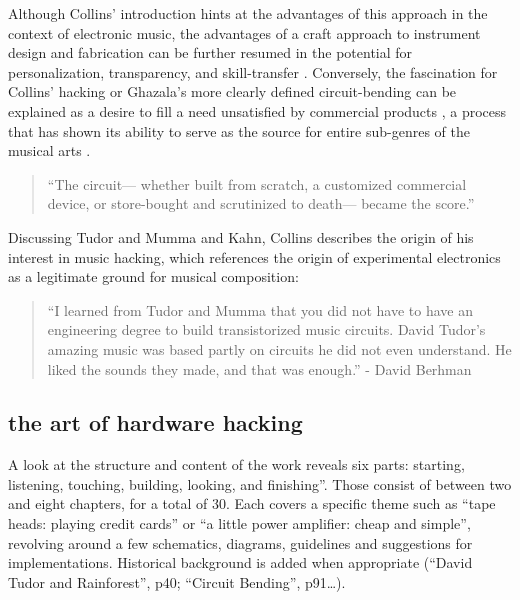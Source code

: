 Although Collins’ introduction hints at the advantages of this approach in the context of electronic music, the advantages of a craft approach to instrument design and fabrication can be further resumed in the potential for personalization, transparency, and skill-transfer \cite{perner2011}. Conversely, the fascination for Collins’ hacking or Ghazala’s more clearly defined circuit-bending can be explained as a desire to fill a need unsatisfied by commercial products \cite{dunne2005}, a process that has shown its ability to serve as the source for entire sub-genres of the musical arts \cite{dunne2005,kelly2009,novak2013}. 
\begin{quote}
“The circuit— whether built from scratch, a customized commercial device, or store-bought and scrutinized to death— became the score.”
\citep{collins2004}
\end{quote}

	Discussing Tudor and Mumma and Kahn, Collins describes the origin of his interest in music hacking, which references the origin of experimental electronics as a legitimate ground for musical composition: 

\begin{quote}
“I learned from Tudor and Mumma that you did not have to have an engineering degree to build transistorized music circuits. David Tudor’s amazing music was based partly on circuits he did not even understand. He liked the sounds they made, and that was enough.” 
- David Berhman \cite[p.ix]{collins2006}  
\end{quote}

\subsection{the art of hardware hacking}

A look at the structure and content of the work reveals six parts: starting, listening, touching, building, looking, and finishing”. Those consist of between two and eight chapters, for a total of 30. Each covers a specific theme such as “tape heads: playing credit cards” or “a little power amplifier: cheap and simple”, revolving around a few schematics, diagrams, guidelines and suggestions for implementations. Historical background is added when appropriate (“David Tudor and Rainforest”, p40; “Circuit Bending”, p91…). 

